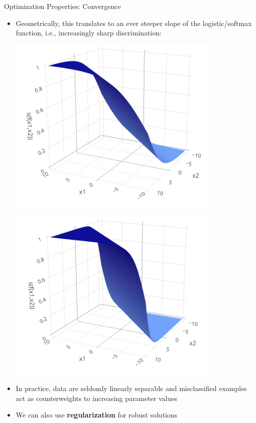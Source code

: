 \documentclass[11pt,compress,t,notes=noshow, xcolor=table]{beamer}
\begin{document}
\begin{vbframe}{Optimization Properties: Convergence}
\framebreak

\begin{itemize}
  \small
  \item
  Geometrically, this translates to an ever steeper slope of the 
  logistic/softmax function, i.e., increasingly sharp discrimination:
  
  \vspace{0.3cm}
  \begin{minipage}[b]{0.5\textwidth}
    \includegraphics[width=0.8\textwidth]{figure/softmax_1}
  \end{minipage}%
  \begin{minipage}[b]{0.5\textwidth}
    \includegraphics[width=0.8\textwidth]{figure/softmax_2}
  \end{minipage}%
  \item In practice, data are seldomly linearly separable and misclassified 
  examples act as counterweights to increasing parameter values
  \item We can also use \textbf{regularization} for  robust solutions
\end{itemize}

\end{vbframe}
\end{document}
